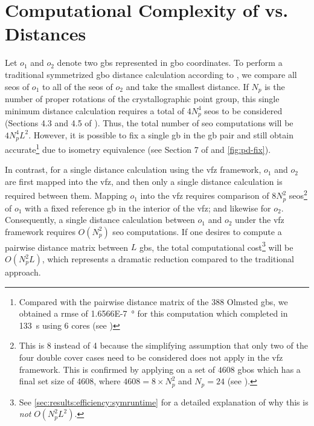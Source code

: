 \documentclass[preprint,12pt]{elsarticle}
\begin{document}
\section{Computational Complexity of  vs.  Distances }
Let $o_1$ and $o_2$ denote two \glspl{gb} represented in \gls{gbo} coordinates. 
To perform a traditional symmetrized \gls{gbo} distance calculation according to \citet{francisGeodesicOctonionMetric2019}, we compare all \glspl{seo} of $o_1$ to all of the \glspl{seo} of $o_2$ and take the smallest distance. If $N_p$ is the number of proper rotations of the crystallographic point group, this single minimum distance calculation requires a total of $4N_p^4$ \glspl{seo} to be considered (Sections 4.3 and 4.5 of \citet{francisGeodesicOctonionMetric2019}). Thus, the total number of \gls{seo} computations will be $4N_p^4L^2$. However, it is possible to fix a single \gls{gb} in the \gls{gb} pair and still obtain accurate\footnote{Compared with the pairwise distance matrix of the 388 Olmsted \glspl{gb}, we obtained a \gls{rmse} of \SI{1.6566E-7}{\degree} for this computation which completed in \SI{133}{\s} using 6 cores (see )} due to isometry equivalence (see Section 7 of \cite{morawiecDistancesGrainInterfaces2019} and \cref{fig:pd-fix}).

In contrast, for a single distance calculation using the \gls{vfz} framework, $o_1$ and $o_2$ are first mapped into the \gls{vfz}, and then only a single distance calculation is required between them. Mapping $o_1$ into the \gls{vfz} requires comparison of $8N_p^2$ \glspl{seo}\footnote{This is 8 instead of 4 because the simplifying assumption that only two of the four double cover cases need to be considered \cite{francisGeodesicOctonionMetric2019} does not apply in the \gls{vfz} framework. This is confirmed by applying  on a set of $4608$ \glspl{gbo} which has a final set size of $4608$, where $4608=8\times N_p^2$ and $N_p=24$ (see ).} of $o_1$ with a fixed reference \gls{gb} in the interior of the \gls{vfz}; and likewise for $o_2$. Consequently, a single distance calculation between $o_1$ and $o_2$ under the \gls{vfz} framework requires $O(N_p^2)$ \gls{seo} computations. If one desires to compute a pairwise distance matrix between $L$ \glspl{gb}, the total computational cost\footnote{See \cref{sec:results:efficiency:symruntime} for a detailed explanation of why this is \emph{not} $O(N_p^2L^2)$.} will be $O(N_p^2L)$, which represents a dramatic reduction compared to the traditional approach.
\end{document}
